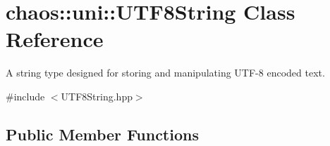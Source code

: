 \hypertarget{classchaos_1_1uni_1_1_u_t_f8_string}{}\section{chaos\+:\+:uni\+:\+:U\+T\+F8\+String Class Reference}
\label{classchaos_1_1uni_1_1_u_t_f8_string}


A string type designed for storing and manipulating U\+T\+F-\/8 encoded text.  




{\ttfamily \#include $<$U\+T\+F8\+String.\+hpp$>$}

\subsection*{Public Member Functions}
